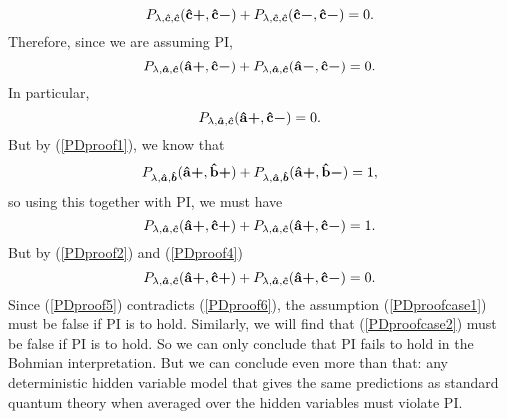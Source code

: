 \begin{equation}
 P_{\lambda,\bm{\hat{c}},\bm{\hat{c}}}({\vb{\hat{{c}}}\bm{+}},{\vb{\hat{{c}}}\bm{-}})+P_{\lambda,\bm{\hat{c}},\bm{\hat{c}}}({\vb{\hat{{c}}}\bm{-}},{\vb{\hat{{c}}}\bm{-}})=0.
\end{equation}
 Therefore, since we are assuming PI, 
 \begin{equation}
 P_{\lambda,\bm{\hat{a}},\bm{\hat{c}}}({\vb{\hat{{a}}}\bm{+}},{\vb{\hat{{c}}}\bm{-}})+P_{\lambda,\bm{\hat{a}},\bm{\hat{c}}}({\vb{\hat{{a}}}\bm{-}},{\vb{\hat{{c}}}\bm{-}})=0.
\end{equation}
 In particular, 
  \begin{equation}\label{PDproof4}
  P_{\lambda,\bm{\hat{a}},\bm{\hat{c}}}({\vb{\hat{{a}}}\bm{+}},{\vb{\hat{{c}}}\bm{-}})=0.
  \end{equation}
  But by (\ref{PDproof1}), we know that 
  \begin{equation}
  P_{\lambda,\bm{\hat{a}},\bm{\hat{b}}}({\vb{\hat{{a}}}\bm{+}},{\vb{\hat{{b}}}\bm{+}})+P_{\lambda,\bm{\hat{a}},\bm{\hat{b}}}({\vb{\hat{{a}}}\bm{+}},{\vb{\hat{{b}}}\bm{-}})=1,
  \end{equation}
  so using this together with PI, we must have
    \begin{equation}\label{PDproof5}
  P_{\lambda,\bm{\hat{a}},\bm{\hat{c}}}({\vb{\hat{{a}}}\bm{+}},{\vb{\hat{{c}}}\bm{+}})+P_{\lambda,\bm{\hat{a}},\bm{\hat{c}}}({\vb{\hat{{a}}}\bm{+}},{\vb{\hat{{c}}}\bm{-}})=1.
  \end{equation}
 But by (\ref{PDproof2}) and (\ref{PDproof4})
\begin{equation}\label{PDproof6}
  P_{\lambda,\bm{\hat{a}},\bm{\hat{c}}}({\vb{\hat{{a}}}\bm{+}},{\vb{\hat{{c}}}\bm{+}})+P_{\lambda,\bm{\hat{a}},\bm{\hat{c}}}({\vb{\hat{{a}}}\bm{+}},{\vb{\hat{{c}}}\bm{-}})=0.
\end{equation}
Since (\ref{PDproof5}) contradicts (\ref{PDproof6}), the assumption (\ref{PDproofcase1}) must be false if PI is to hold. Similarly, we will find that (\ref{PDproofcase2}) must be false if PI is to hold. So we can only conclude that PI fails to hold in the Bohmian interpretation.   But we can conclude even more than that: any deterministic hidden variable model that gives the same predictions as standard quantum theory when averaged over the hidden variables must violate PI.\label{PIdeterminism} 

  




